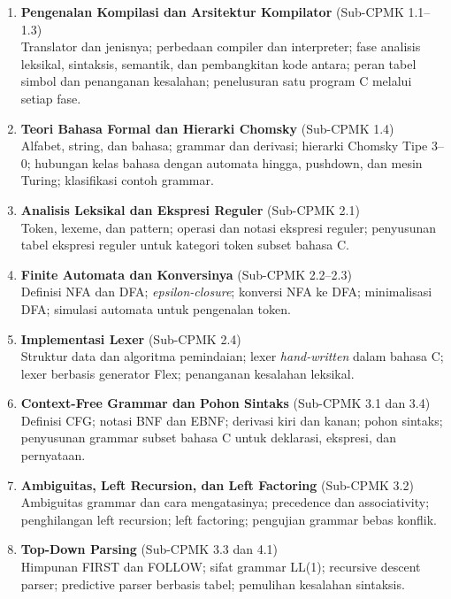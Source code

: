 \documentclass[12pt,a4paper]{article}
\begin{document}
\begin{enumerate}[leftmargin=*]
  \item \textbf{Pengenalan Kompilasi dan Arsitektur Kompilator} (Sub-CPMK 1.1--1.3)\\
  Translator dan jenisnya; perbedaan compiler dan interpreter; fase analisis leksikal, sintaksis, semantik, dan pembangkitan kode antara; peran tabel simbol dan penanganan kesalahan; penelusuran satu program C melalui setiap fase.

  \item \textbf{Teori Bahasa Formal dan Hierarki Chomsky} (Sub-CPMK 1.4)\\
  Alfabet, string, dan bahasa; grammar dan derivasi; hierarki Chomsky Tipe 3--0; hubungan kelas bahasa dengan automata hingga, pushdown, dan mesin Turing; klasifikasi contoh grammar.

  \item \textbf{Analisis Leksikal dan Ekspresi Reguler} (Sub-CPMK 2.1)\\
  Token, lexeme, dan pattern; operasi dan notasi ekspresi reguler; penyusunan tabel ekspresi reguler untuk kategori token subset bahasa C.

  \item \textbf{Finite Automata dan Konversinya} (Sub-CPMK 2.2--2.3)\\
  Definisi NFA dan DFA; \textit{epsilon-closure}; konversi NFA ke DFA; minimalisasi DFA; simulasi automata untuk pengenalan token.

  \item \textbf{Implementasi Lexer} (Sub-CPMK 2.4)\\
  Struktur data dan algoritma pemindaian; lexer \textit{hand-written} dalam bahasa C; lexer berbasis generator Flex; penanganan kesalahan leksikal.

  \item \textbf{Context-Free Grammar dan Pohon Sintaks} (Sub-CPMK 3.1 dan 3.4)\\
  Definisi CFG; notasi BNF dan EBNF; derivasi kiri dan kanan; pohon sintaks; penyusunan grammar subset bahasa C untuk deklarasi, ekspresi, dan pernyataan.

  \item \textbf{Ambiguitas, Left Recursion, dan Left Factoring} (Sub-CPMK 3.2)\\
  Ambiguitas grammar dan cara mengatasinya; precedence dan associativity; penghilangan left recursion; left factoring; pengujian grammar bebas konflik.

  \item \textbf{Top-Down Parsing} (Sub-CPMK 3.3 dan 4.1)\\
  Himpunan FIRST dan FOLLOW; sifat grammar LL(1); recursive descent parser; predictive parser berbasis tabel; pemulihan kesalahan sintaksis.


\end{enumerate}
\end{document}
